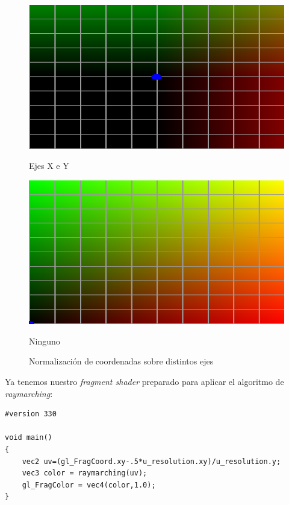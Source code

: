 \begin{figure}[htbp]
    \begin{minipage}[b]{0.45\textwidth}
        \centering
        \includegraphics[width=\textwidth]{Plantilla-TFG-master/img/normXYColor.png}
        \caption{Ejes X e Y}
    \end{minipage}
    \hfill
    \begin{minipage}[b]{0.45\textwidth}
        \centering
        \includegraphics[width=\textwidth]{Plantilla-TFG-master/img/noNormColor.png}
        \caption{Ninguno}
    \end{minipage}
    \caption{Normalización de coordenadas sobre distintos ejes}
    \label{fig:uv}
\end{figure}

Ya tenemos nuestro \textit{fragment shader} preparado para aplicar el algoritmo de \textit{raymarching}: 
\begin{lstlisting}[title=Procesador de fragmentos]
#version 330

void main()
{
    vec2 uv=(gl_FragCoord.xy-.5*u_resolution.xy)/u_resolution.y;
    vec3 color = raymarching(uv);
    gl_FragColor = vec4(color,1.0);
}
\end{lstlisting}


